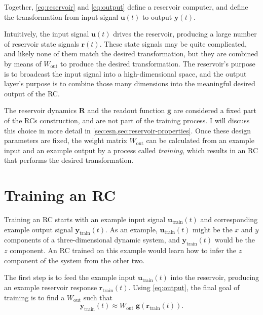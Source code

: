 
Together, \cref{eq:reservoir} and \cref{eq:output} define a reservoir
computer, and define the transformation from input signal $\bm{u}(t)$
to output $\bm{y}(t)$.

Intuitively, the input signal $\bm{u}(t)$ drives the reservoir,
producing a large number of reservoir state signals $\bm{r}(t)$. These
state signals may be quite complicated, and likely none of them match
the desired transformation, but they are combined by means of
$W_\text{out}$ to produce the desired transformation. The reservoir's
purpose is to broadcast the input signal into a high-dimensional
space, and the output layer's purpose is to combine those many dimensions
into the meaningful desired output of the RC.

The reservoir dynamics $\bm{R}$ and the readout function $\bm{g}$ are
considered a fixed part of the RCs construction, and are not part of
the training process. I will discuss this choice in more detail in
\cref{sec:esn,sec:reservoir-properties}. Once these design parameters
are fixed, the weight matrix $W_\text{out}$ can be calculated from an
example input and an example output by a process called
\emph{training}, which results in an RC that performs the desired
transformation.

\section{Training an RC}\label{sec:training}

Training an RC starts with an example input signal
$\bm{u}_\text{train}(t)$ and corresponding example output signal
$\bm{y}_\text{train}(t)$. As an example, $\bm{u}_\text{train}(t)$ might be
the $x$ and $y$ components of a three-dimensional dynamic system, and
$\bm{y}_\text{train}(t)$ would be the $z$ component. An RC trained on this
example would learn how to infer the $z$ component of the system from
the other two.

The first step is to feed the example input $\bm{u}_\text{train}(t)$ into the reservoir, producing an example reservoir response $\bm{r}_\text{train}(t)$. Using \cref{eq:output}, the final goal of training is to find a $W_\text{out}$ such that
\begin{equation}
  \label{eq:approx-output}
  \mathbf{y}_\text{train}(t) \approx W_\text{out}\;\mathbf{g}\left(\mathbf{r}_\text{train}(t)\right).
\end{equation}

